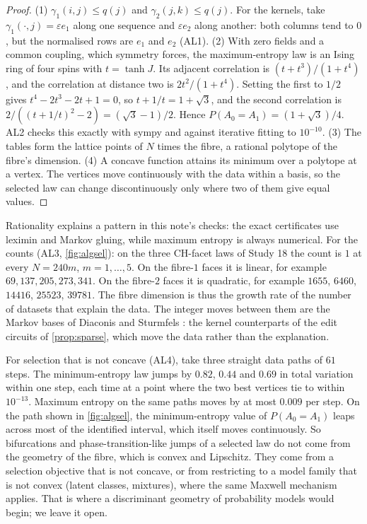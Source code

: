 \documentclass[11pt]{article}
\theoremstyle{definition}\newtheorem{definition}[theorem]{Definition}\newtheorem{remark}[theorem]{Remark}\newtheorem{example}[theorem]{Example}\newtheorem{problem}[theorem]{Open problem}\crefname{problem}{Problem}{Problems}
\begin{document}
\begin{proof}
(1) $\gamma_1(i,j)\le q(j)$ and $\gamma_2(j,k)\le q(j)$. For the kernels, take $\gamma_1(\cdot,j)=\varepsilon e_1$ along one sequence and $\varepsilon e_2$ along another: both columns tend to $0$, but the normalised rows are $e_1$ and $e_2$ (AL1). (2) With zero fields and a common coupling, which symmetry forces, the maximum-entropy law is an Ising ring of four spins with $t=\tanh J$. Its adjacent correlation is $(t+t^3)/(1+t^4)$, and the correlation at distance two is $2t^2/(1+t^4)$. Setting the first to $1/2$ gives $t^4-2t^3-2t+1=0$, so $t+1/t=1+\sqrt3$, and the second correlation is $2/((t+1/t)^2-2)=(\sqrt3-1)/2$. Hence $P(A_0=A_1)=(1+\sqrt3)/4$. AL2 checks this exactly with sympy and against iterative fitting to $10^{-10}$. (3) The tables form the lattice points of $N$ times the fibre, a rational polytope of the fibre's dimension. (4) A concave function attains its minimum over a polytope at a vertex. The vertices move continuously with the data within a basis, so the selected law can change discontinuously only where two of them give equal values.
\end{proof}

Rationality explains a pattern in this note's checks: the exact certificates use leximin and Markov gluing, while maximum entropy is always numerical. For the counts (AL3, \cref{fig:algsel}): on the three CH-facet laws of Study 18 the count is $1$ at every $N=240m$, $m=1,\dots,5$. On the fibre-$1$ faces it is linear, for example $69,137,205,273,341$. On the fibre-$2$ faces it is quadratic, for example $1655$, $6460$, $14416$, $25523$, $39781$. The fibre dimension is thus the growth rate of the number of datasets that explain the data. The integer moves between them are the Markov bases of Diaconis and Sturmfels \cite{DiaconisSturmfels1998}: the kernel counterparts of the edit circuits of \cref{prop:sparse}, which move the data rather than the explanation.

For selection that is not concave (AL4), take three straight data paths of $61$ steps. The minimum-entropy law jumps by $0.82$, $0.44$ and $0.69$ in total variation within one step, each time at a point where the two best vertices tie to within $10^{-13}$. Maximum entropy on the same paths moves by at most $0.009$ per step. On the path shown in \cref{fig:algsel}, the minimum-entropy value of $P(A_0=A_1)$ leaps across most of the identified interval, which itself moves continuously. So bifurcations and phase-transition-like jumps of a selected law do not come from the geometry of the fibre, which is convex and Lipschitz. They come from a selection objective that is not concave, or from restricting to a model family that is not convex (latent classes, mixtures), where the same Maxwell mechanism applies. That is where a discriminant geometry of probability models would begin; we leave it open.
\end{document}
